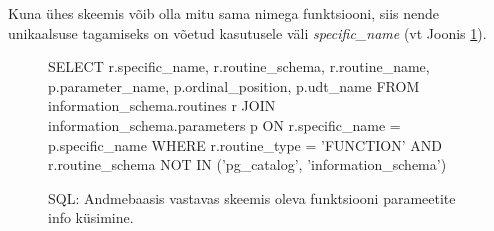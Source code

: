 \documentclass[a4paper,12pt]{article} %
\begin{document}
Kuna ühes skeemis võib olla mitu sama nimega funktsiooni, siis nende unikaalsuse tagamiseks on võetud kasutusele väli \textit{specific\_name} (vt Joonis \ref{sql_funktsiooni_parameetrite_metainfo_küsimine}).

\begin{figure}[H]
\centering
\begin{SQL}
SELECT r.specific_name, r.routine_schema, r.routine_name, p.parameter_name, p.ordinal_position, p.udt_name
FROM information_schema.routines r
JOIN information_schema.parameters p ON r.specific_name = p.specific_name
WHERE r.routine_type = 'FUNCTION'
  AND r.routine_schema NOT IN ('pg_catalog', 'information_schema')
\end{SQL}
\caption{SQL: Andmebaasis vastavas skeemis oleva funktsiooni parameetite info küsimine.}
\label{sql_funktsiooni_parameetrite_metainfo_küsimine}
\end{figure}
\end{document}
